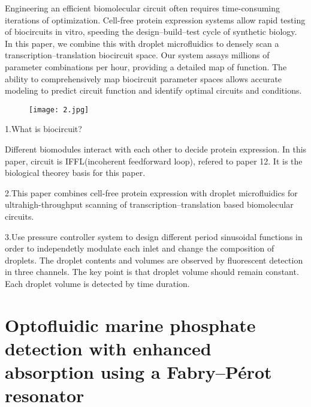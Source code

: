 \documentclass{article}
\begin{document}
Engineering an efficient biomolecular circuit often requires time-consuming iterations of optimization. Cell-free protein expression systems allow rapid testing of biocircuits in vitro, speeding the design–build–test cycle of synthetic biology. In this paper, we combine this with droplet microfluidics to densely scan a transcription–translation biocircuit space. Our system assays millions of parameter combinations per hour, providing a detailed map of function. The ability to comprehensively map biocircuit parameter spaces allows accurate modeling to predict circuit function and identify optimal circuits and conditions. 

\begin{figure}[H]
\centering
\texttt{[image: 2.jpg]}
\end{figure}

1.What is biocircuit? 

Different biomodules interact with each other to decide protein expression.
In this paper, circuit is IFFL(incoherent feedforward loop), refered to paper 12. It is the biological theorey basis for this paper. 


2.This paper combines cell-free protein expression with droplet microfluidics for ultrahigh-throughput scanning of transcription–translation based biomolecular circuits.


3.Use pressure controller system  to design different period sinusoidal functions in order to independetly modulate each inlet and change the composition of droplets. The droplet contents and volumes are observed by  fluorescent detection in three channels.
The key point is that droplet volume should remain constant. 
Each droplet volume is detected by time duration.


\part{Optofluidic marine phosphate detection with enhanced absorption using a Fabry–Pérot resonator}
\end{document}
